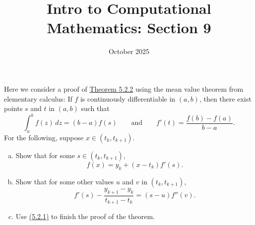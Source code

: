 \documentclass[11pt]{article}
\title{Intro to Computational Mathematics: Section 9}
\date{October 2025}
\newenvironment{problem}[2][Question]{\begin{trivlist}
\item[\hskip \labelsep {\bfseries #1}\hskip \labelsep {\bfseries #2.}]}{\end{trivlist}}
\theoremstyle{definition}
\begin{document}
\maketitle

\begin{problem}{5.2.5}
    Here we consider a proof of \href{https://fncbook.com/pwlin/#theorem-pwlin-converge}{Theorem 5.2.2} using the mean value theorem from elementary calculus: If $f$ is continuously differentiable in $(a, b)$, then there exist points $s$ and $t$ in $(a, b)$ such that $$\int_a^b f(z) \, dz = (b - a)f(s) \qquad \text{and} \qquad f'(t) = \frac{f(b) - f(a)}{b - a}.$$
    For the following, suppose $x \in (t_k, t_{k+1})$.
    \begin{enumerate}[(a)]
        \item Show that for some $s \in (t_k, t_{k+1})$, $$f(x) = y_k + (x - t_k)f'(s).$$
        \item Show that for some other values $u$ and $v$ in $(t_k, t_{k+1})$, $$f'(s) - \frac{y_{k+1} - y_k}{t_{k+1} - t_k} = (s - u)f''(v).$$
        \item Use \href{https://fncbook.com/pwlin/#pwlinear}{(5.2.1)} to finish the proof of the theorem.
    \end{enumerate}
\end{problem}
\end{document}
